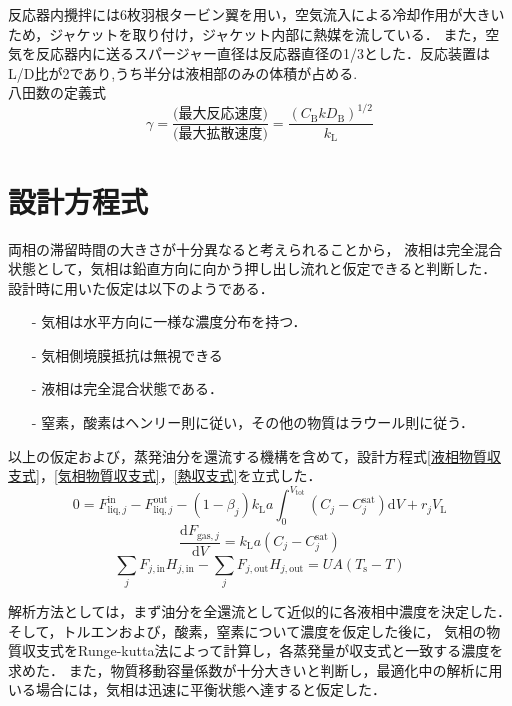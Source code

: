 \documentclass[a4j]{jsreport}
\newcommand{\diff}{\mathrm{d}}
\begin{document}
反応器内攪拌には6枚羽根タービン翼を用い，空気流入による冷却作用が大きいため，ジャケットを取り付け，ジャケット内部に熱媒を流している．
また，空気を反応器内に送るスパージャー直径は反応器直径の1/3とした．反応装置はL/D比が2であり,うち半分は液相部のみの体積が占める.\\

八田数の定義式
\begin{equation}
    \gamma = \frac{\text{(最大反応速度)}}{\text{(最大拡散速度)}} = \frac{(C_\mathrm{B} k D_\mathrm{B})^{1/2}}{k_\mathrm{L}}
\end{equation}

\section{設計方程式}
両相の滞留時間の大きさが十分異なると考えられることから，
液相は完全混合状態として，気相は鉛直方向に向かう押し出し流れと仮定できると判断した．
設計時に用いた仮定は以下のようである．
\begin{itemize}
    \item[-] 気相は水平方向に一様な濃度分布を持つ．
    \item[-] 気相側境膜抵抗は無視できる
    \item[-] 液相は完全混合状態である．
    \item[-] 窒素，酸素はヘンリー則に従い，その他の物質はラウール則に従う．
\end{itemize}
以上の仮定および，蒸発油分を還流する機構を含めて，設計方程式\eqref{液相物質収支式}，\eqref{気相物質収支式}，\eqref{熱収支式}を立式した．
\begin{equation}
    \label{液相物質収支式}
    0 = F^\text{in}_{\text{liq},j} - F^\text{out}_{\text{liq},j} - (1 - \beta_j) k_\mathrm{L} a \int^{V_\text{tot}}_0(C_j - C^\text{sat}_j) \diff V + r_j V_\mathrm{L}
\end{equation}
\begin{equation}
    \label{気相物質収支式}
    \frac{\diff F_{\text{gas},j}}{\diff V} = k_\mathrm{L} a (C_j - C^\text{sat}_j)
\end{equation}
\begin{equation}
    \label{熱収支式}
    \sum_jF_{j,\mathrm{in}}H_{j,\mathrm{in}}-\sum_jF_{j,\text{out}}H_{j,\text{out}} = UA(T_\mathrm{s}-T)
\end{equation}

解析方法としては，まず油分を全還流として近似的に各液相中濃度を決定した．そして，トルエンおよび，酸素，窒素について濃度を仮定した後に，
気相の物質収支式をRunge-kutta法によって計算し，各蒸発量が収支式と一致する濃度を求めた．
また，物質移動容量係数が十分大きいと判断し，最適化中の解析に用いる場合には，気相は迅速に平衡状態へ達すると仮定した．
\end{document}
